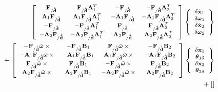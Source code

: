 \documentclass[10pt,dvips,fleqn,subeqn]{report}
\newcommand{\T}[1]{\bm{\mathbf{#1}}}
\newcommand{\TT}[1]{\bm{\mathbf{#1}}}
\begin{document}
\begin{align}
	\footnotesize
	\sqbr{\matr{cccc}{
		\T{F}_{/\dot{\tilde{\T{d}}}} 
		& \T{F}_{/\dot{\tilde{\T{d}}}} \TT{A}_1^T
		& - \T{F}_{/\dot{\tilde{\T{d}}}}
		& - \T{F}_{/\dot{\tilde{\T{d}}}} \TT{A}_2^T \\
%
		\TT{A}_1 \T{F}_{/\dot{\tilde{\T{d}}}} 
		& \TT{A}_1 \T{F}_{/\dot{\tilde{\T{d}}}} \TT{A}_1^T
		& - \TT{A}_1 \T{F}_{/\dot{\tilde{\T{d}}}}
		& - \TT{A}_1 \T{F}_{/\dot{\tilde{\T{d}}}} \TT{A}_2^T \\
%
		- \T{F}_{/\dot{\tilde{\T{d}}}} 
		& - \T{F}_{/\dot{\tilde{\T{d}}}} \TT{A}_1^T
		& \T{F}_{/\dot{\tilde{\T{d}}}}
		& \T{F}_{/\dot{\tilde{\T{d}}}} \TT{A}_2^T \\
%
		- \TT{A}_2 \T{F}_{/\dot{\tilde{\T{d}}}} 
		& - \TT{A}_2 \T{F}_{/\dot{\tilde{\T{d}}}} \TT{A}_1^T
		& \TT{A}_2 \T{F}_{/\dot{\tilde{\T{d}}}}
		& \TT{A}_2 \T{F}_{/\dot{\tilde{\T{d}}}} \TT{A}_2^T
	}} \cubr{\cvvect{
		\delta\dot{\T{x}}_1 \\
		\delta\T{\omega}_1 \\
		\delta\dot{\T{x}}_2 \\
		\delta\T{\omega}_2
	}} & \nonumber \\
	\footnotesize
	\mbox{} + \sqbr{\matr{cccc}{
		- \T{F}_{/\dot{\tilde{\T{d}}}} \hat{\T{\omega}}\times{}
		& - \T{F}_{/\dot{\tilde{\T{d}}}} \TT{B}_1
		& \T{F}_{/\dot{\tilde{\T{d}}}} \hat{\T{\omega}}\times{}
		& - \T{F}_{/\dot{\tilde{\T{d}}}} \TT{B}_2 \\
%
		- \TT{A}_1 \T{F}_{/\dot{\tilde{\T{d}}}} \hat{\T{\omega}}\times{}
		& - \TT{A}_1 \T{F}_{/\dot{\tilde{\T{d}}}} \TT{B}_1
		& \TT{A}_1 \T{F}_{/\dot{\tilde{\T{d}}}} \hat{\T{\omega}}\times{}
		& - \TT{A}_1 \T{F}_{/\dot{\tilde{\T{d}}}} \TT{B}_2 \\
%
		\T{F}_{/\dot{\tilde{\T{d}}}} \hat{\T{\omega}}\times{}
		& \T{F}_{/\dot{\tilde{\T{d}}}} \TT{B}_1
		& - \T{F}_{/\dot{\tilde{\T{d}}}} \hat{\T{\omega}}\times{}
		& \T{F}_{/\dot{\tilde{\T{d}}}} \TT{B}_2 \\
%
		\TT{A}_2 \T{F}_{/\dot{\tilde{\T{d}}}} \hat{\T{\omega}}\times{}
		& \TT{A}_2 \T{F}_{/\dot{\tilde{\T{d}}}} \TT{B}_1
		& - \TT{A}_2 \T{F}_{/\dot{\tilde{\T{d}}}} \hat{\T{\omega}}\times{}
		& \TT{A}_2 \T{F}_{/\dot{\tilde{\T{d}}}} \TT{B}_2
	}}\cubr{\cvvect{
		\delta\T{x}_1 \\
		\T{\theta}_{1\delta} \\
		\delta\T{x}_2 \\
		\T{\theta}_{2\delta}
	}} & \nonumber \\
	\footnotesize
	\mbox{} + \sqbr{\matr{cccc}{
}}
\end{align}
\end{document}

